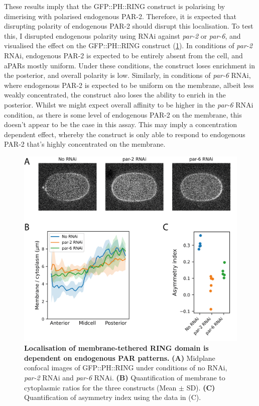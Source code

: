 \documentclass[12pt]{"report"}
\newcommand{\mycaption}[2]{\caption[#1]{\textbf{#1.} #2}}
\begin{document}
These results imply that the GFP::PH::RING construct is polarising by dimerising with polarised endogenous PAR-2. Therefore, it is expected that disrupting polarity of endogenous PAR-2 should disrupt this localisation. To test this, I disrupted endogenous polarity using RNAi against \textit{par-2} or \textit{par-6}, and visualised the effect on the GFP::PH::RING construct (\cref{fig:ph_ring_rnai}). In conditions of \textit{par-2} RNAi, endogenous PAR-2 is expected to be entirely absent from the cell, and aPARs mostly uniform. Under these conditions, the construct loses enrichment in the posterior, and overall polarity is low. Similarly, in conditions of \textit{par-6} RNAi, where endogenous PAR-2 is expected to be uniform on the membrane, albeit less weakly concentrated, the construct also loses the ability to enrich in the posterior. Whilst we might expect overall affinity to be higher in the \textit{par-6} RNAi condition, as there is some level of endogenous PAR-2 on the membrane, this doesn't appear to be the case in this assay. This may imply a concentration dependent effect, whereby the construct is only able to respond to endogenous PAR-2 that's highly concentrated on the membrane.\\

\begin{figure}
\includegraphics[scale=1]{ph_ring_rnai}
\centering
\mycaption{Localisation of membrane-tethered RING domain is dependent on endogenous PAR patterns}{
\textbf{(A)} Midplane confocal images of GFP::PH::RING under conditions of no RNAi, \textit{par-2} RNAi and \textit{par-6} RNAi.
\textbf{(B)} Quantification of membrane to cytoplasmic ratios for the three constructs (Mean $\pm$ SD).
\textbf{(C)} Quantification of asymmetry index using the data in (C).
}
\label{fig:ph_ring_rnai}
\end{figure}
\end{document}
